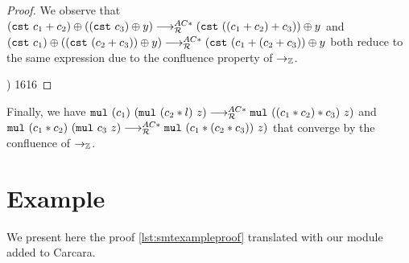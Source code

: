 \begin{proof}
We observe that $\cst{c_1 + c_2} \oplus (\cst{c_3} \oplus y) \MRAC \add{\cst{((c_1 + c_2) + c_3)}}{y}$
and $\cst{c_1} \oplus (\cst{(c_2 + c_3)} \oplus y) \MRAC \add{\cst{(c_1 + (c_2 + c_3)}}{y}$
both reduce to the same expression due to the confluence property of $\ra_\bb{Z}$.

\cp
{  } 
{  }
{ )} 
{16}{16}
\end{proof}

Finally, we have $\mul{(c_1)}{(\mul{(c_2 * l)}{z})} \MRAC \mul{((c_1 * c_2) * c_3)}{z})$
and $\mul{(c_1 * c_2)}{(\mul{c_3}{z}}) \MRAC \mul{(c_1 * (c_2 * c_3))}{z})$ that converge by the confluence of $\ra_\bb{Z}$.

\section{Example}
\label{app:example-translation}

We present here the proof \cref{lst:smtexampleproof} translated with our module added to Carcara.

